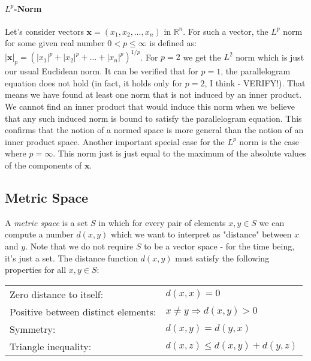 \paragraph{$L^p$-Norm} Let's consider vectors $\mathbf{x} = (x_1, x_2, \ldots, x_n)$ in $\mathbb{R}^n$. For such a vector, the $L^p$ norm for some given real number $0 < p \leq \infty$ is defined as: $ |\mathbf{x}|_p = (|x_1|^p + |x_2|^p + \ldots + |x_n|^p)^{1/p}$. For $p=2$ we get the $L^2$ norm which is just our usual Euclidean norm. It can be verified that for $p=1$, the parallelogram equation does not hold (in fact, it holds only for $p = 2$, I think - VERIFY!). That means we have found at least one norm that is not induced by an inner product. We cannot find an inner product that would induce this norm when we believe that any such induced norm is bound to satisfy the parallelogram equation. This confirms that the notion of a normed space is more general than the notion of an inner product space. Another important special case for the $L^p$ norm is the case where $p = \infty$. This norm just is just equal to the maximum of the absolute values of the components of $\mathbf{x}$.






\subsection{Metric Space}
A \emph{metric space} is a set $S$ in which for every pair of elements $x,y \in S$ we can compute a number $d(x,y)$ which we want to interpret as "distance" between $x$ and $y$. Note that we do not require $S$ to be a vector space - for the time being, it's just a set. The distance function $d(x,y)$ must satisfy the following properties for all $x,y \in S$:

\medskip
\begin{tabular}{l l}
Zero distance to itself:            & $d(x, x) = 0$  \\
Positive between distinct elements: & $x \neq y \Rightarrow d(x,y) > 0$  \\
Symmetry:                           & $d(x, y) = d(y, x)$  \\
Triangle inequality:                & $d(x,z) \leq d(x,y) + d(y,z)$
\end{tabular}
\medskip

